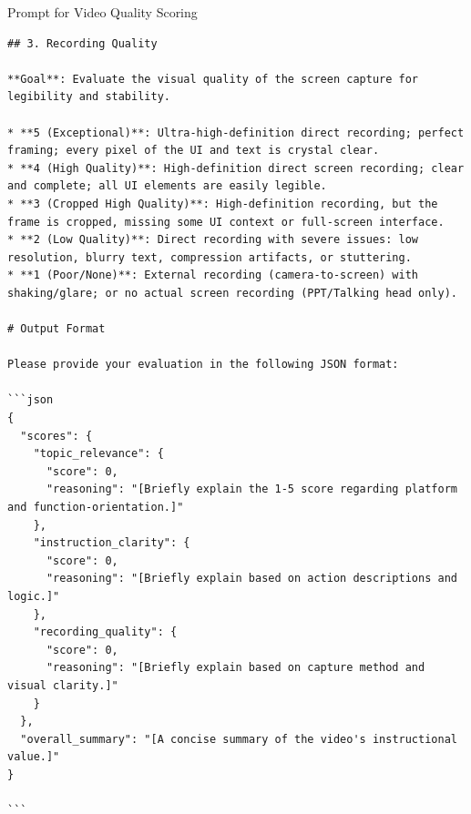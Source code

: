 \documentclass{article}
\theoremstyle{plain}
\theoremstyle{definition}
\theoremstyle{remark}
\begin{document}
\begin{promptbox}{Prompt for Video Quality Scoring}
\begin{lstlisting}
## 3. Recording Quality

**Goal**: Evaluate the visual quality of the screen capture for legibility and stability.

* **5 (Exceptional)**: Ultra-high-definition direct recording; perfect framing; every pixel of the UI and text is crystal clear.
* **4 (High Quality)**: High-definition direct screen recording; clear and complete; all UI elements are easily legible.
* **3 (Cropped High Quality)**: High-definition recording, but the frame is cropped, missing some UI context or full-screen interface.
* **2 (Low Quality)**: Direct recording with severe issues: low resolution, blurry text, compression artifacts, or stuttering.
* **1 (Poor/None)**: External recording (camera-to-screen) with shaking/glare; or no actual screen recording (PPT/Talking head only).

# Output Format

Please provide your evaluation in the following JSON format:

```json
{
  "scores": {
    "topic_relevance": {
      "score": 0,
      "reasoning": "[Briefly explain the 1-5 score regarding platform and function-orientation.]"
    },
    "instruction_clarity": {
      "score": 0,
      "reasoning": "[Briefly explain based on action descriptions and logic.]"
    },
    "recording_quality": {
      "score": 0,
      "reasoning": "[Briefly explain based on capture method and visual clarity.]"
    }
  },
  "overall_summary": "[A concise summary of the video's instructional value.]"
}

```
\end{lstlisting}
\end{promptbox}
\end{document}
